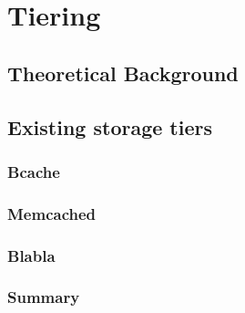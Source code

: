 \chapter{Tiering}\label{ch:tiering}

\section{Theoretical Background}

\section{Existing storage tiers}

\subsection{Bcache}

\subsection{Memcached}

\subsection{Blabla}

\subsection{Summary}





